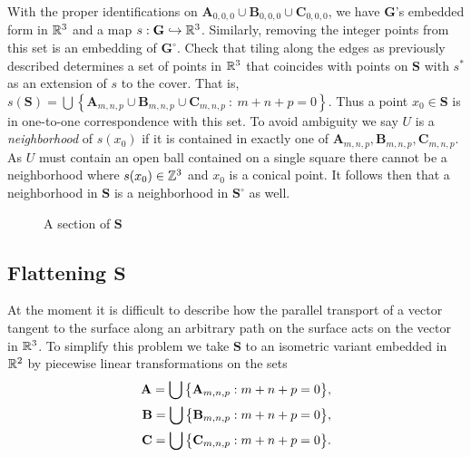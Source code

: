 \documentclass[]{article}
\def\bG{\mathbf{G}} \def\bGs{\mathbf{G}^\circ}
\begin{document}
With the proper identifications on  $\mathbf{A}_{0,0,0}\cup\mathbf{B}_{0,0,0}\cup\mathbf{C}_{0,0,0}$, we have $\bG$'s embedded form in $\mathbb{R}^3$ and a map $s:\bG\hookrightarrow\RR^3$. Similarly, removing the integer points from this set is an embedding of $\bGs$. Check that tiling along the edges as previously described determines a set of points in $\mathbb{R}^3$ that coincides with points on $\mathbf{S}$ with $s^*$ as an extension of $s$ to the cover. That is, $s(\mathbf{S})=\bigcup\left\{\mathbf{A}_{m,n,p}\cup\mathbf{B}_{m,n,p}\cup\mathbf{C}_{m,n,p}~:~m+n+p=0\right\}$. Thus a point $x_0\in\mathbf{S}$ is in one-to-one correspondence with this set. To avoid ambiguity we say $U$ is a \emph{neighborhood} of $s(x_0)$ if it is contained in exactly one of $\mathbf{A}_{m,n,p}, \mathbf{B}_{m,n,p}, \mathbf{C}_{m,n,p}$. As $U$ must contain an open ball contained on a single square there cannot be a neighborhood where $s(x_0)\in\mathbb{Z}^3$ and $x_0$ is a conical point. It follows then that a neighborhood in $\mathbf{S}$ is a neighborhood in $\mathbf{S}^\circ$ as well. 

\begin{figure}[H]
\centering

\caption{A section of $\mathbf{S}$}
\end{figure}

\subsection{Flattening $\mathbf{S}$}
At the moment it is difficult to describe how the parallel transport of a vector tangent to the surface along an arbitrary path on the surface acts on the vector in $\mathbb{R}^3$. To simplify this problem we take $\mathbf{S}$ to an isometric variant embedded in $\mathbb{R}^2$ by piecewise linear transformations on the sets 
\begin{align*}
\mathbf{A}=\bigcup\big{\{}\mathbf{A}_{m,n,p}: m+n+p=0\big{\}},
\\\mathbf{B}=\bigcup\big{\{}\mathbf{B}_{m,n,p}: m+n+p=0\big{\}},
\\\mathbf{C}=\bigcup\big{\{}\mathbf{C}_{m,n,p}: m+n+p=0\big{\}}.
\end{align*}
\end{document}
